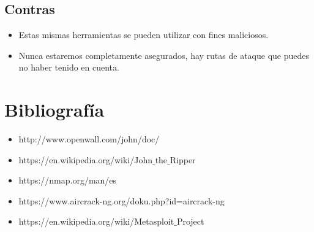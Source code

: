 \documentclass[a4paper, 11pt]{article}
\theoremstyle{plain}
\begin{document}
\subsection{Contras}
\begin{itemize}
	\item Estas mismas herramientas se pueden utilizar con fines maliciosos.
	\item Nunca estaremos completamente asegurados, hay rutas de ataque que puedes no haber tenido en cuenta.
\end{itemize}

\section{Bibliografía}
\begin{itemize}
	\item http://www.openwall.com/john/doc/
	\item https://en.wikipedia.org/wiki/John$\_$the$\_$Ripper
	\item https://nmap.org/man/es
	\item https://www.aircrack-ng.org/doku.php?id=aircrack-ng
	\item https://en.wikipedia.org/wiki/Metasploit$\_$Project
\end{itemize}
\end{document}
